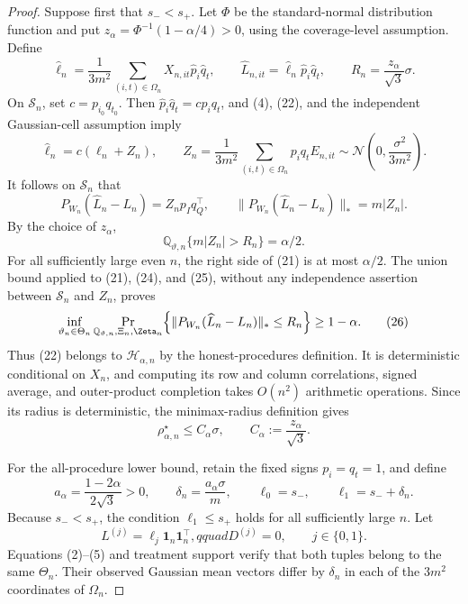 \documentclass{article}
\begin{document}
\begin{proof}
Suppose first that \(s_-<s_+\).  Let \(\Phi\) be the standard-normal distribution function and put \(z_\alpha=\Phi^{-1}(1-\alpha/4)>0\), using the coverage-level assumption.  Define
\[
\widehat\ell_n=\frac1{3m^2}\sum_{(i,t)\in\Omega_n}
X_{n,it}\widehat p_i\widehat q_t,
\qquad
\widehat L_{n,it}=\widehat\ell_n\widehat p_i\widehat q_t,
\qquad
R_n=\frac{z_\alpha}{\sqrt3}\sigma.                    \tag{22}
\]
On \(\mathcal S_n\), set \(c=p_{i_0}q_{t_0}\).  Then \(\widehat p_i\widehat q_t=cp_iq_t\), and (4), (22), and the independent Gaussian-cell assumption imply
\[
\widehat\ell_n=c(\ell_n+Z_n),
\qquad
Z_n=\frac1{3m^2}\sum_{(i,t)\in\Omega_n}p_iq_tE_{n,it}
\sim\mathcal N\!\left(0,\frac{\sigma^2}{3m^2}\right).           \tag{23}
\]
It follows on \(\mathcal S_n\) that
\[
P_{W_n}(\widehat L_n-L_n)=Z_np_Iq_Q^{\top},
\qquad
\lVert P_{W_n}(\widehat L_n-L_n)\rVert_*=m|Z_n|.       \tag{24}
\]
By the choice of \(z_\alpha\),
\[
\mathbb Q_{\vartheta,n}\{m|Z_n|>R_n\}=\alpha/2.       \tag{25}
\]
For all sufficiently large even \(n\), the right side of (21) is at most \(\alpha/2\).  The union bound applied to (21), (24), and (25), without any independence assertion between \(\mathcal S_n\) and \(Z_n\), proves
\[
\inf_{\vartheta_n\in\Theta_n}
\Pr_{\mathbb Q_{\vartheta,n},\Xi_n,\Zeta_n}
\!\left\{\lVert P_{W_n}(\widehat L_n-L_n)\rVert_*\le R_n\right\}
\ge1-\alpha.                                            \tag{26}
\]
Thus (22) belongs to \(\mathcal H_{\alpha,n}\) by the honest-procedures definition.  It is deterministic conditional on \(X_n\), and computing its row and column correlations, signed average, and outer-product completion takes \(O(n^2)\) arithmetic operations.  Since its radius is deterministic, the minimax-radius definition gives
\[
\rho_{\alpha,n}^{\star}\le C_\alpha\sigma,
\qquad C_\alpha:=\frac{z_\alpha}{\sqrt3}.             \tag{27}
\]

For the all-procedure lower bound, retain the fixed signs \(p_i=q_t=1\), and define
\[
a_\alpha=\frac{1-2\alpha}{2\sqrt3}>0,
\qquad
\delta_n=\frac{a_\alpha\sigma}{m},
\qquad
\ell_0=s_-,\qquad \ell_1=s_-+\delta_n.                \tag{28}
\]
Because \(s_-<s_+\), the condition \(\ell_1\le s_+\) holds for all sufficiently large \(n\).  Let
\[
L^{(j)}=\ell_j\mathbf1_n\mathbf1_n^{\top},qquad D^{(j)}=0,
\qquad j\in\{0,1\}.
\]
Equations (2)--(5) and treatment support verify that both tuples belong to the same \(\Theta_n\).  Their observed Gaussian mean vectors differ by \(\delta_n\) in each of the \(3m^2\) coordinates of \(\Omega_n\).


\end{proof}
\end{document}
